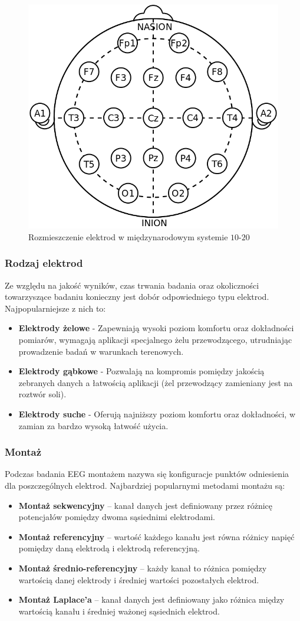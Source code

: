 \documentclass{./assets/wfis}
\begin{document}
\begin{figure}[h]
    \centering
    \includegraphics[width=0.5\columnwidth]{thesis/assets/10-20_system_electrodes.png}
    \caption{Rozmieszczenie elektrod w międzynarodowym systemie $10$-$20$}
    \label{fig:10-20-system}
\end{figure}

\subsubsection{Rodzaj elektrod}
Ze względu na jakość wyników, czas trwania badania oraz okoliczności towarzyszące badaniu konieczny jest dobór odpowiedniego typu elektrod. Najpopularniejsze z nich to:

\begin{itemize}
    \item \textbf{Elektrody żelowe} - Zapewniają wysoki poziom komfortu oraz dokładności pomiarów, wymagają aplikacji specjalnego żelu przewodzącego, utrudniając prowadzenie badań w warunkach terenowych.
    \item \textbf{Elektrody gąbkowe} - Pozwalają na kompromis pomiędzy jakością zebranych danych a łatwością aplikacji (żel przewodzący zamieniany jest na roztwór soli).
    \item \textbf{Elektrody suche} - Oferują najniższy poziom komfortu oraz dokładności, w zamian za bardzo wysoką łatwość użycia.
\end{itemize}

\subsubsection{Montaż}
Podczas badania EEG montażem nazywa się konfiguracje punktów odniesienia dla poszczególnych elektrod. Najbardziej popularnymi metodami montażu są:
\begin{itemize}
    \item \textbf{Montaż sekwencyjny} – kanał danych jest definiowany przez różnicę potencjałów pomiędzy dwoma sąsiednimi elektrodami.
    \item \textbf{Montaż referencyjny} – wartość każdego kanału jest równa różnicy napięć pomiędzy daną elektrodą i elektrodą referencyjną.
    \item \textbf{Montaż średnio-referencyjny} – każdy kanał to różnica pomiędzy wartością danej elektrody i średniej wartości pozostałych elektrod. 
    \item \textbf{Montaż Laplace’a} – kanał danych jest definiowany jako różnica między wartością kanału i średniej ważonej sąsiednich elektrod.
\end{itemize}
\end{document}
